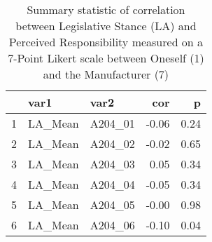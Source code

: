 \begin{table}[ht]
\centering
\begin{tabular}{rllrr}
  \hline
 & var1 & var2 & cor & p \\ 
  \hline
1 & LA\_Mean & A204\_01 & -0.06 & 0.24 \\ 
  2 & LA\_Mean & A204\_02 & -0.02 & 0.65 \\ 
  3 & LA\_Mean & A204\_03 & 0.05 & 0.34 \\ 
  4 & LA\_Mean & A204\_04 & -0.05 & 0.34 \\ 
  5 & LA\_Mean & A204\_05 & -0.00 & 0.98 \\ 
  6 & LA\_Mean & A204\_06 & -0.10 & 0.04 \\ 
   \hline
\end{tabular}
\caption{Summary statistic of correlation between Legislative Stance (LA) and Perceived Responsibility measured on a 7-Point Likert scale between Oneself (1) and the Manufacturer (7)} 
\end{table}

